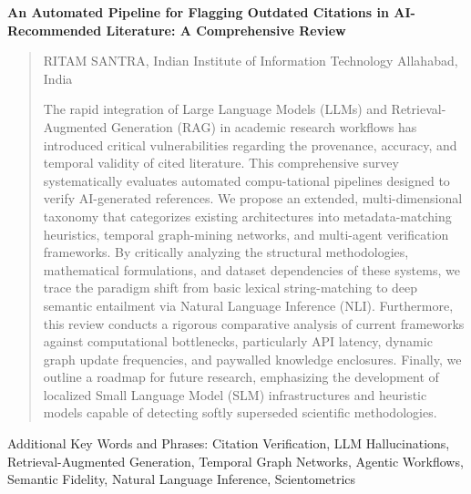 \documentclass[
]{article}
\author{}
\date{}
\begin{document}
\textbf{An Automated Pipeline for Flagging Outdated Citations in
AI-Recommended Literature: A Comprehensive Review}

\begin{quote}
RITAM SANTRA, Indian Institute of Information Technology Allahabad,
India

The rapid integration of Large Language Models (LLMs) and
Retrieval-Augmented Generation (RAG) in academic research workflows has
introduced critical vulnerabilities regarding the provenance, accuracy,
and temporal validity of cited literature. This comprehensive survey
systematically evaluates automated compu-tational pipelines designed to
verify AI-generated references. We propose an extended,
multi-dimensional taxonomy that categorizes existing architectures into
metadata-matching heuristics, temporal graph-mining networks, and
multi-agent verification frameworks. By critically analyzing the
structural methodologies, mathematical formulations, and dataset
dependencies of these systems, we trace the paradigm shift from basic
lexical string-matching to deep semantic entailment via Natural Language
Inference (NLI). Furthermore, this review conducts a rigorous
comparative analysis of current frameworks against computational
bottlenecks, particularly API latency, dynamic graph update frequencies,
and paywalled knowledge enclosures. Finally, we outline a roadmap for
future research, emphasizing the development of localized Small Language
Model (SLM) infrastructures and heuristic models capable of detecting
softly superseded scientific methodologies.
\end{quote}

Additional Key Words and Phrases: Citation Verification, LLM
Hallucinations, Retrieval-Augmented Generation, Temporal Graph Networks,
Agentic Workflows, Semantic Fidelity, Natural Language Inference,
Scientometrics
\end{document}
